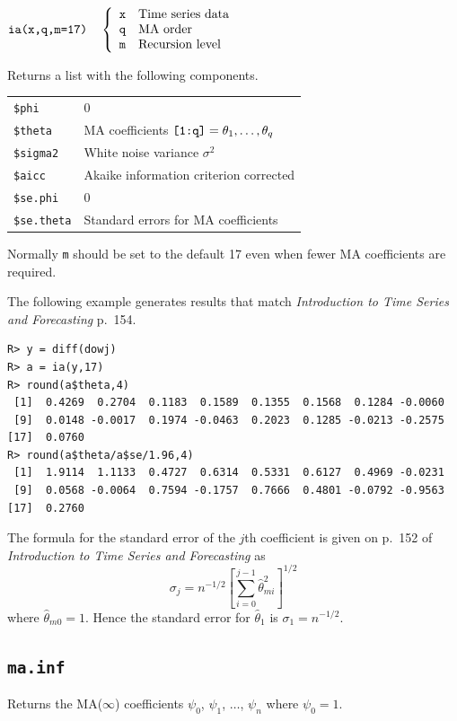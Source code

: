 \documentclass[11pt]{article}
\begin{document}
\bigskip
$
\hbox{\tt ia(x,q,m=17)}\quad\left\{\begin{array}{ll}
{\tt x} & \hbox{Time series data}\\
{\tt q} & \hbox{MA order}\\
{\tt m} & \hbox{Recursion level}
\end{array}\right.
$

\bigskip
\noindent
Returns a list with the following components.

\begin{center}
\begin{tabular}{ll}
{\tt \$phi} & 0\\
{\tt \$theta} & MA coefficients $\hbox{\tt[1:q]}=\theta_1,\ldots,\theta_q$\\
{\tt \$sigma2} & White noise variance $\sigma^2$\\
{\tt \$aicc} & Akaike information criterion corrected\\
{\tt \$se.phi} & 0\\
{\tt \$se.theta} & Standard errors for MA coefficients
\end{tabular}
\end{center}

\noindent
Normally {\tt m} should be set to the default 17 even when fewer MA coefficients
are required.

\bigskip
\noindent
The following example generates results that match
{\it Introduction to Time Series and Forecasting} p.\ 154.
\begin{verbatim}
R> y = diff(dowj)
R> a = ia(y,17)
R> round(a$theta,4)
 [1]  0.4269  0.2704  0.1183  0.1589  0.1355  0.1568  0.1284 -0.0060
 [9]  0.0148 -0.0017  0.1974 -0.0463  0.2023  0.1285 -0.0213 -0.2575
[17]  0.0760
R> round(a$theta/a$se/1.96,4)
 [1]  1.9114  1.1133  0.4727  0.6314  0.5331  0.6127  0.4969 -0.0231
 [9]  0.0568 -0.0064  0.7594 -0.1757  0.7666  0.4801 -0.0792 -0.9563
[17]  0.2760
\end{verbatim}

\noindent
The formula for the standard error of the $j$th coefficient is given
on p.\ 152 of {\it Introduction to Time Series and Forecasting} as
\[
\sigma_j=n^{-1/2}\left[\sum_{i=0}^{j-1}\hat\theta_{mi}^2\right]^{1/2}
\]
where $\hat\theta_{m0}=1$.
Hence the standard error for $\hat\theta_1$ is $\sigma_1=n^{-1/2}$.

\newpage

\subsection{\tt ma.inf}
Returns the MA($\infty$) coefficients
$\psi_0$, $\psi_1$, $\ldots$, $\psi_n$ where $\psi_0=1$.
\end{document}
